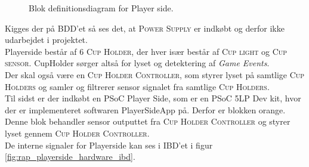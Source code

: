 \documentclass[Rapport/Rapport_main.tex]{subfiles}
\begin{document}
\begin{figure}[H]
    \centering
    \caption{Blok definitionsdiagram for Player side.}
    \label{fig:rap_playerside_hardware_bdd}
\end{figure}
Kigges der på BDD'et så ses det, at \textsc{Power Supply} er indkøbt og derfor ikke udarbejdet i projektet.\\
Playerside består af 6 \textsc{Cup Holder}, der hver især består af \textsc{Cup light} og \textsc{Cup sensor}. CupHolder sørger altså for lyset og detektering af \textit{Game Events}.\\ 
Der skal også være en \textsc{Cup Holder Controller}, som styrer lyset på samtlige \textsc{Cup Holders} og samler og filtrerer sensor signalet fra samtlige \textsc{Cup Holders}. \\ 
Til sidst er der indkøbt en PSoC Player Side, som er en PSoC 5LP Dev kit\cite{psoc5lp}, hvor der er implementeret softwaren PlayerSideApp på. Derfor er blokken orange. Denne blok behandler sensor outputtet fra \textsc{Cup Holder Controller} og styrer lyset gennem \textsc{Cup Holder Controller}.\\
De interne signaler for Playerside kan ses i IBD'et i figur \ref{fig:rap_playerside_hardware_ibd}.
\end{document}
